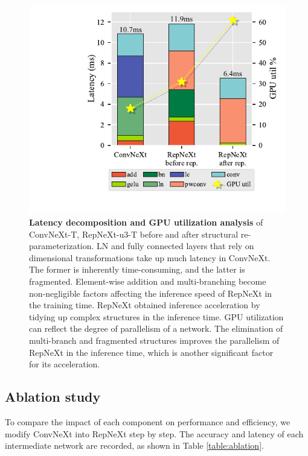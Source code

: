\documentclass[preprint,12pt]{elsarticle}
\begin{document}
\begin{figure}
  \centering
  \includegraphics[width=0.7\linewidth]{figs/fig5.pdf}
  \caption{\textbf{Latency decomposition and GPU utilization analysis} of ConvNeXt-T, RepNeXt-u3-T before and after structural re-parameterization. LN and fully connected layers that rely on dimensional transformations take up much latency in ConvNeXt. The former is inherently time-consuming, and the latter is fragmented. Element-wise addition and multi-branching become non-negligible factors affecting the inference speed of RepNeXt in the training time. RepNeXt obtained inference acceleration by tidying up complex structures in the inference time. GPU utilization can reflect the degree of parallelism of a network. The elimination of multi-branch and fragmented structures improves the parallelism of RepNeXt in the inference time, which is another significant factor for its acceleration.}\label{pie}
\end{figure}


\subsection{Ablation study}
\label{sec:ablation}

To compare the impact of each component on performance and efficiency, we modify ConvNeXt into RepNeXt step by step. The accuracy and latency of each intermediate network are recorded, as shown in Table \ref{table:ablation}.
\end{document}
